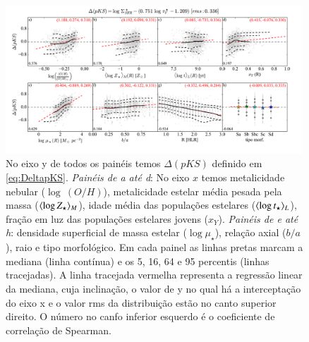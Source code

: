 \begin{figure}
	\centering
	\includegraphics[width=0.99\textwidth]{figuras/deltapKS.pdf}
	\caption[Resíduos da {\em pseudo-KS}]
	{No eixo y de todos os painéis temos $\Delta(pKS)$ definido em \eqref{eq:DeltapKS}. \emph{Painéis
de a até d}: No eixo $x$ temos metalicidade nebular ($\log\ (O/H)$), metalicidade estelar média
pesada pela massa ($\meanM{\log Z_\star}$), idade média das populações estelares ($\meanL{\log
t_\star}$), fração em luz das populações estelares jovens ($x_Y$). \emph{Painéis de e até h}:
densidade superficial de massa estelar ($\log \mu_\star$), relação axial ($b/a$), raio e tipo
morfológico. Em cada painel as linhas pretas marcam a mediana (linha contínua) e os 5, 16, 64 e 95
percentis (linhas tracejadas). A linha tracejada vermelha representa a regressão linear da mediana,
cuja inclinação, o valor de y no qual há a interceptação do eixo x e o valor rms da distribuição
estão no canto superior direito. O número no canfo inferior esquerdo é o coeficiente de correlação
de Spearman.}
	\label{fig:deltapKS}
\end{figure}

